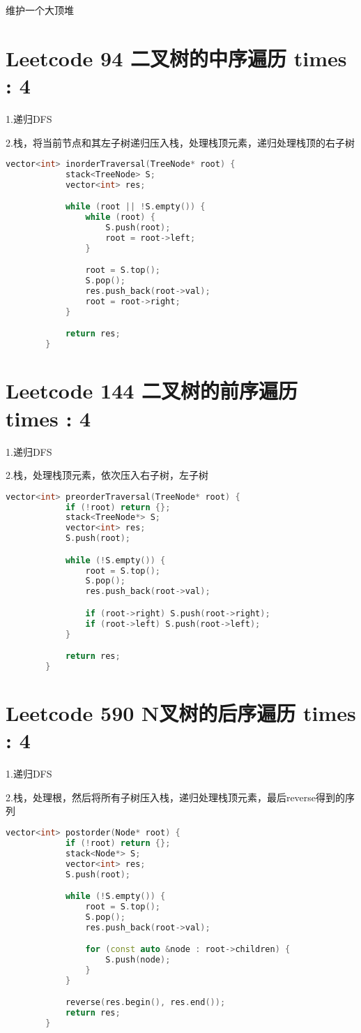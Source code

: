 \documentclass[UTF8]{ctexart}
\begin{document}
维护一个大顶堆

\section{Leetcode 94 二叉树的中序遍历 times : 4}
1.递归DFS

2.栈，将当前节点和其左子树递归压入栈，处理栈顶元素，递归处理栈顶的右子树

\begin{framed}
	\begin{lstlisting}[language=C++]
		vector<int> inorderTraversal(TreeNode* root) {
			stack<TreeNode> S;
			vector<int> res;

			while (root || !S.empty()) {
				while (root) {
					S.push(root);
					root = root->left;
				}

				root = S.top();
				S.pop();
				res.push_back(root->val);
				root = root->right;
			}

			return res;
		}
	\end{lstlisting}
\end{framed}

\section{Leetcode 144 二叉树的前序遍历 times : 4}
1.递归DFS

2.栈，处理栈顶元素，依次压入右子树，左子树

\begin{framed}
	\begin{lstlisting}[language=C++]
		vector<int> preorderTraversal(TreeNode* root) {
			if (!root) return {};
			stack<TreeNode*> S;
			vector<int> res;
			S.push(root);

			while (!S.empty()) {
				root = S.top();
				S.pop();
				res.push_back(root->val);

				if (root->right) S.push(root->right);
				if (root->left) S.push(root->left);
			}

			return res;
		}
	\end{lstlisting}
\end{framed}

\section{Leetcode 590 N叉树的后序遍历 times : 4}
1.递归DFS

2.栈，处理根，然后将所有子树压入栈，递归处理栈顶元素，最后reverse得到的序列

\begin{framed}
	\begin{lstlisting}[language=C++]
		vector<int> postorder(Node* root) {
			if (!root) return {};
			stack<Node*> S;
			vector<int> res;
			S.push(root);

			while (!S.empty()) {
				root = S.top();
				S.pop();
				res.push_back(root->val);

				for (const auto &node : root->children) {
					S.push(node);
				}
			}

			reverse(res.begin(), res.end());
			return res;
		}
	\end{lstlisting}
\end{framed}
\end{document}
